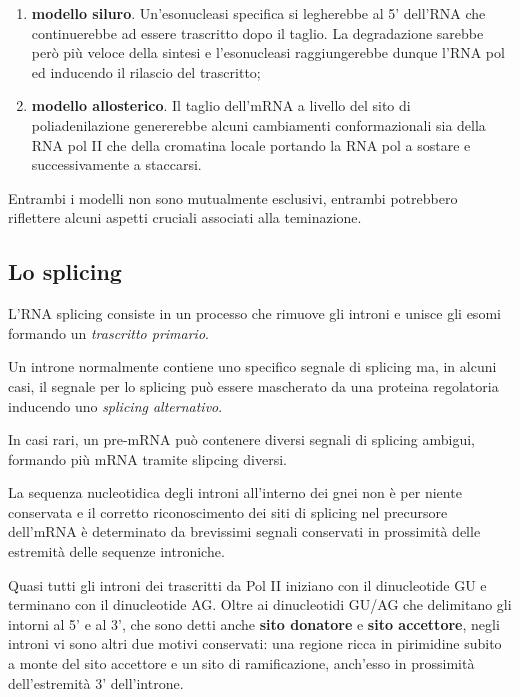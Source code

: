 \documentclass[]{article}
\begin{document}
\begin{enumerate}
\def\labelenumi{\arabic{enumi}.}
\itemsep1pt\parskip0pt
\item
  \textbf{modello siluro}. Un'esonucleasi specifica si legherebbe al 5'
  dell'RNA che continuerebbe ad essere trascritto dopo il taglio. La
  degradazione sarebbe però più veloce della sintesi e l'esonucleasi
  raggiungerebbe dunque l'RNA pol ed inducendo il rilascio del
  trascritto;
\item
  \textbf{modello allosterico}. Il taglio dell'mRNA a livello del sito
  di poliadenilazione genererebbe alcuni cambiamenti conformazionali sia
  della RNA pol II che della cromatina locale portando la RNA pol a
  sostare e successivamente a staccarsi.
\end{enumerate}

Entrambi i modelli non sono mutualmente esclusivi, entrambi potrebbero
riflettere alcuni aspetti cruciali associati alla teminazione.

\subsection{Lo splicing}\label{lo-splicing}

L'RNA splicing consiste in un processo che rimuove gli introni e unisce
gli esomi formando un \emph{trascritto primario}.

Un introne normalmente contiene uno specifico segnale di splicing ma, in
alcuni casi, il segnale per lo splicing può essere mascherato da una
proteina regolatoria inducendo uno \emph{splicing alternativo}.

In casi rari, un pre-mRNA può contenere diversi segnali di splicing
ambigui, formando più mRNA tramite slipcing diversi.

La sequenza nucleotidica degli introni all'interno dei gnei non è per
niente conservata e il corretto riconoscimento dei siti di splicing nel
precursore dell'mRNA è determinato da brevissimi segnali conservati in
prossimità delle estremità delle sequenze introniche.

Quasi tutti gli introni dei trascritti da Pol II iniziano con il
dinucleotide GU e terminano con il dinucleotide AG. Oltre ai
dinucleotidi GU/AG che delimitano gli intorni al 5' e al 3', che sono
detti anche \textbf{sito donatore} e \textbf{sito accettore}, negli
introni vi sono altri due motivi conservati: una regione ricca in
pirimidine subito a monte del sito accettore e un sito di ramificazione,
anch'esso in prossimità dell'estremità 3' dell'introne.
\end{document}
